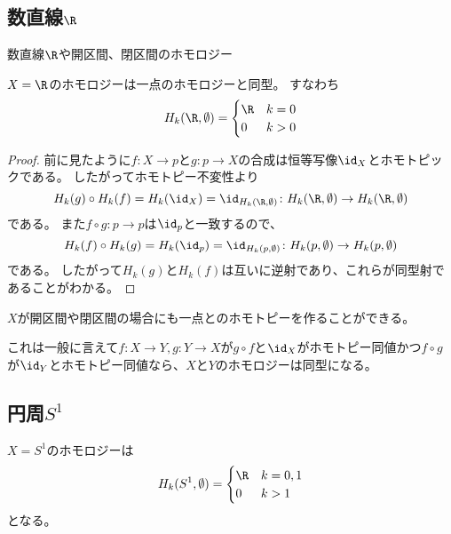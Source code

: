 \documentclass{jsarticle}
\begin{document}
\subsection{数直線$\R$}
数直線$\R$や開区間、閉区間のホモロジー
\begin{prop}
$X=\R$のホモロジーは一点のホモロジーと同型。
すなわち
\[
H_k(\R,\emptyset)=\begin{cases}\R&k=0\\0&k>0\end{cases}
\]
\end{prop}
\begin{proof}
前に見たように$f\colon X\to p$と$g\colon p\to X$の合成は恒等写像$\id_X$とホモトピックである。
したがってホモトピー不変性より
\[
H_k(g)\circ H_k(f)=H_k(\id_X)=\id_{H_k(\R,\emptyset)}\colon H_k(\R,\emptyset)\to H_k(\R,\emptyset)
\]
である。
また$f\circ g\colon p\to p$は$\id_p$と一致するので、
\[
H_k(f)\circ H_k(g)=H_k(\id_p)=\id_{H_k(p,\emptyset)}\colon H_k(p,\emptyset)\to H_k(p,\emptyset)
\]
である。
したがって$H_k(g)$と$H_k(f)$は互いに逆射であり、これらが同型射であることがわかる。
\end{proof}

$X$が開区間や閉区間の場合にも一点とのホモトピーを作ることができる。

これは一般に言えて$f\colon X\to Y, g\colon Y\to X$が$g\circ f$と$\id_X$がホモトピー同値かつ$f\circ g$が$\id_Y$とホモトピー同値なら、$X$と$Y$のホモロジーは同型になる。

\subsection{円周$S^1$}
\begin{prop}
$X=S^1$のホモロジーは
\[
H_k(S^1,\emptyset)=\begin{cases}\R&k=0,1\\0&k>1\end{cases}
\]
となる。
\end{prop}
\end{document}
